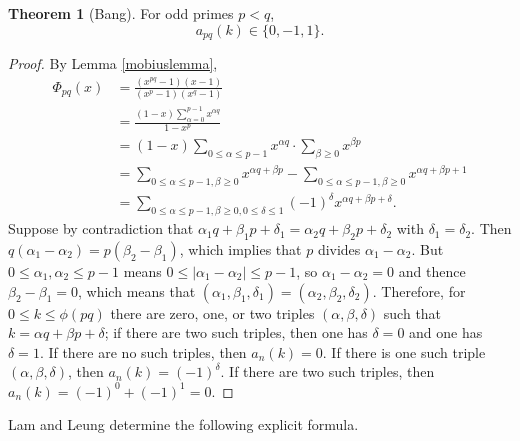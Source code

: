 \documentclass{article}
\theoremstyle{definition}
\newtheorem{theorem}{Theorem}
\theoremstyle{definition}
\begin{document}
\begin{theorem}[Bang]
For odd primes $p<q$,
\[
a_{pq}(k) \in \{0,-1,1\}.
\] 
\end{theorem}
\begin{proof}
By Lemma \ref{mobiuslemma},
\begin{align*}
\Phi_{pq}(x)&=\frac{(x^{pq}-1)(x-1)}{(x^p-1)(x^q-1)}\\
&=\frac{(1-x)\sum_{\alpha=0}^{p-1} x^{\alpha q}}{1-x^p}\\
&=(1-x) \sum_{0 \leq \alpha \leq p-1}  x^{\alpha q} \cdot \sum_{\beta \geq 0} x^{\beta p}\\
&=\sum_{0 \leq \alpha \leq p-1, \beta \geq 0} x^{\alpha q+\beta p}
-\sum_{0 \leq \alpha \leq p-1, \beta \geq 0} x^{\alpha q+\beta p+1}\\
&=\sum_{0 \leq \alpha \leq p-1, \beta \geq 0, 0 \leq \delta \leq 1} (-1)^\delta x^{\alpha q+\beta p+\delta}.
\end{align*}
Suppose by contradiction that $\alpha_1 q+\beta_1 p + \delta_1 = 
\alpha_2 q +\beta_2 p +\delta_2$ with $\delta_1=\delta_2$. Then 
$q(\alpha_1-\alpha_2) = p(\beta_2-\beta_1)$, which implies that $p$ divides $\alpha_1-\alpha_2$. But
$0 \leq \alpha_1,\alpha_2 \leq p-1$ means $0 \leq |\alpha_1-\alpha_2| \leq p-1$, so $\alpha_1-\alpha_2=0$ and thence
$\beta_2-\beta_1=0$, which means that $(\alpha_1,\beta_1,\delta_1)=(\alpha_2,\beta_2,\delta_2)$. 
Therefore, for $0 \leq k \leq \phi(pq)$ there are zero, one, or two triples $(\alpha,\beta,\delta)$ such that
$k=\alpha q + \beta p + \delta$; if there are two such triples, then one has $\delta=0$ and one has $\delta=1$.
If there are no such triples, then $a_n(k)=0$. If there is one such triple $(\alpha,\beta,\delta)$, then $a_n(k)=(-1)^\delta$.
If there are two such triples, then $a_n(k) = (-1)^0+(-1)^1 = 0$. 
\end{proof}


Lam and Leung \cite{lam1996} determine the following explicit formula.
\end{document}
